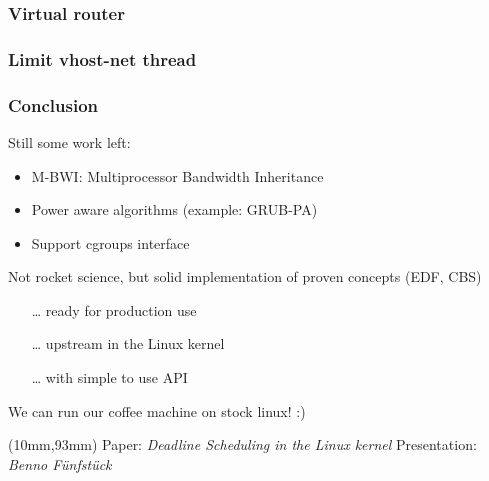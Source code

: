\documentclass[aspectratio=1610,xcolor=svgnames]{beamer}
\begin{document}
\begin{frame}[label=current]\frametitle{Virtual router}
  \begin{center}
  \end{center}
\end{frame}

\begin{frame}\frametitle{Limit vhost-net thread}
  \begin{center}
    
  \end{center}
\end{frame}

\begin{frame}
  \frametitle{Conclusion} 
    Still some work left:
    \begin{itemize} 
      \item M-BWI: Multiprocessor Bandwidth Inheritance
      \item Power aware algorithms (example: GRUB-PA)
      \item Support cgroups interface
    \end{itemize}

    Not rocket science, but solid implementation of proven concepts (EDF, CBS)
    \begin{itemize}
      \item[\ldots] ready for production use
      \item[\ldots] upstream in the Linux kernel
      \item[\ldots] with simple to use API
    \end{itemize}

    We can run our coffee machine on stock linux! :)
      
  \begin{textblock*}{15cm}(10mm,93mm)
    \footnotesize{Paper: \textit{Deadline Scheduling in the Linux kernel}\hspace{1cm}
      Presentation: \textit{Benno Fünfstück}}
  \end{textblock*}
\end{frame}
\end{document}
